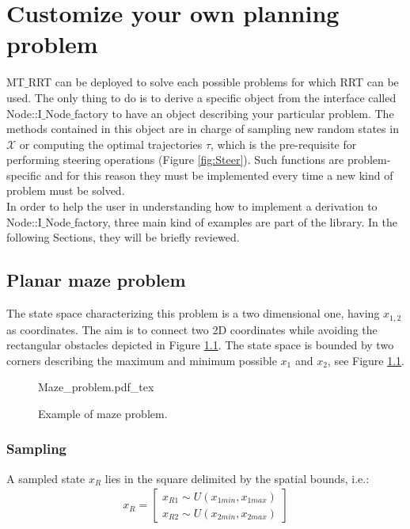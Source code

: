 \chapter{Customize your own planning problem}
\label{chap:custom}

MT$\_$RRT can be deployed to solve each possible problems for which RRT can be used. The only thing to do is to derive a specific object from the interface called Node::I$\_$Node$\_$factory to have an object describing your particular problem. The methods contained in this object are in charge of sampling new random states in $\mathcal{X}$ or computing the optimal trajectories $\tau$, which is the pre-requisite for performing steering operations (Figure \ref{fig:Steer}).
Such functions are problem-specific and for this reason they must be implemented every time a new kind of problem must be solved.
\\
In order to help the user in understanding how to implement a derivation to Node::I$\_$Node$\_$factory, three main kind of examples are part of the library. In the following Sections, they will be briefly reviewed.

\section{Planar maze problem}

The state space characterizing this problem is a two dimensional one, having $x_{1,2}$ as coordinates. The aim is to connect two 2D coordinates while avoiding the rectangular obstacles depicted in Figure \ref{fig:Maze_problem}.
The state space is bounded by two corners describing the maximum and minimum possible $x_1$ and $x_2$, see Figure \ref{fig:Maze_problem}.

 \begin{figure}
	 \centering
 \def\svgwidth{0.85 \columnwidth}
 {Maze_problem.pdf_tex} 
	 \caption{Example of maze problem.}
 \label{fig:Maze_problem}
 \end{figure}

\subsection{Sampling}

A sampled state $x_R$ lies in the square delimited by the spatial bounds, i.e.:
\begin{eqnarray}
x_R = \begin{bmatrix} x_{R1} \sim U(x_{1min}, x_{1max}) \\ x_{R2} \sim U(x_{2min}, x_{2max})  \end{bmatrix}
\end{eqnarray}

